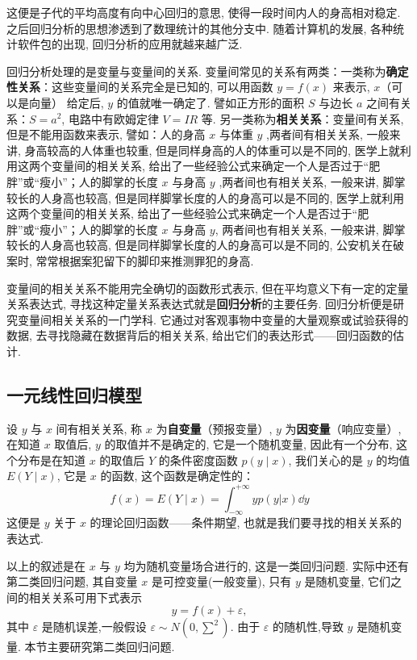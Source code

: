 这便是子代的平均高度有向中心回归的意思, 使得一段时间内人的身高相对稳定. 之后回归分析的思想渗透到了数理统计的其他分支中. 随着计算机的发展, 各种统计软件包的出现, 回归分析的应用就越来越广泛.

回归分析处理的是变量与变量间的关系. 变量间常见的关系有两类：一类称为\textbf{确定性关系}：这些变量间的关系完全是已知的, 可以用函数 $y = f(x)$ 来表示, $x$（可以是向量） 给定后, $y$ 的值就唯一确定了. 譬如正方形的面积 $S$ 与边长 $a$ 之间有关系：$S = a^{2}$, 电路中有欧姆定律 $V = IR$ 等. 另一类称为\textbf{相关关系}：变量间有关系, 但是不能用函数来表示, 譬如：人的身高 $x$ 与体重 $y$ ,两者间有相关关系, 一般来讲, 身高较高的人体重也较重, 但是同样身高的人的体重可以是不同的, 医学上就利用这两个变量间的相关关系, 给出了一些经验公式来确定一个人是否过于“肥胖”或“瘦小”；人的脚掌的长度 $x$ 与身高 $y$ ,两者间也有相关关系, 一般来讲, 脚掌较长的人身高也较高, 但是同样脚掌长度的人的身高可以是不同的, 医学上就利用这两个变量间的相关关系, 给出了一些经验公式来确定一个人是否过于“肥胖”或“瘦小”；人的脚掌的长度 $x$ 与身高 $y$, 两者间也有相关关系, 一般来讲, 脚掌较长的人身高也较高, 但是同样脚掌长度的人的身高可以是不同的, 公安机关在破案时, 常常根据案犯留下的脚印来推测罪犯的身高.

变量间的相关关系不能用完全确切的函数形式表示, 但在平均意义下有一定的定量关系表达式, 寻找这种定量关系表达式就是\textbf{回归分析}的主要任务. 回归分析便是研究变量间相关关系的一门学科. 它通过对客观事物中变量的大量观察或试验获得的数据, 去寻找隐藏在数据背后的相关关系, 给出它们的表达形式——回归函数的估计.

\subsection{一元线性回归模型}\label{ssec:8.4.2}

设 $y$ 与 $x$ 间有相关关系, 称 $x$ 为\textbf{自变量}（预报变量）, $y$ 为\textbf{因变量}（响应变量）, 在知道 $x$ 取值后, $y$ 的取值并不是确定的, 它是一个随机变量, 因此有一个分布, 这个分布是在知道 $x$ 的取值后 $Y$ 的条件密度函数 $p(y \mid x)$, 我们关心的是 $y$ 的均值 $E(Y \mid x)$, 它是 $x$ 的函数, 这个函数是确定性的：
\begin{equation}
  f(x) = E(Y \mid x) = \int_{-\infty}^{+\infty} y p(y \vert x) \dd y
\end{equation}
这便是 $y$ 关于 $x$ 的理论回归函数——条件期望, 也就是我们要寻找的相关关系的表达式.

以上的叙述是在 $x$ 与 $y$ 均为随机变量场合进行的, 这是一类回归问题. 实际中还有第二类回归问题, 其自变量 $x$ 是可控变量(一般变量), 只有 $ y$ 是随机变量, 它们之间的相关关系可用下式表示
\begin{equation*}
  y = f(x) + \varepsilon,
\end{equation*}
其中 $\varepsilon$ 是随机误差,一般假设 $\varepsilon \sim N(0,\sum^2)$. 由于 $\varepsilon$ 的随机性,导致 $y$ 是随机变量. 本节主要研究第二类回归问题.

